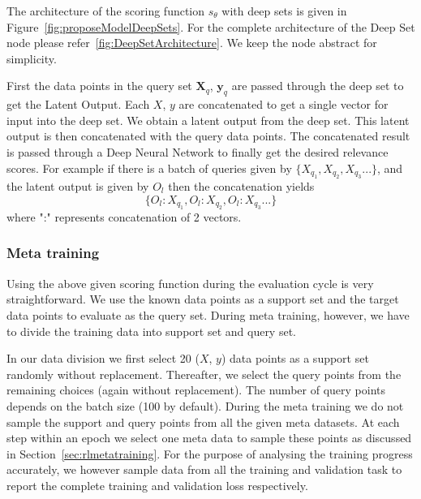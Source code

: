 \documentclass[12pt, twoside, ngerman]{report}
\begin{document}
The  architecture of the scoring function $s_{\theta}$ with deep sets is given in Figure~\ref{fig:proposeModelDeepSets}.
For the complete architecture of the Deep Set node please refer~\ref{fig:DeepSetArchitecture}.
We keep the node abstract for simplicity.\

First the data points in the query set $\textbf{X}_q$, $\textbf{y}_q$ are passed through the deep set to get the Latent Output.
Each $X$, $y$ are concatenated to get a single vector for input into the deep set.
We obtain a latent output from the deep set.
This latent output is then concatenated with the query data points.
The concatenated result is passed through a Deep Neural Network to finally get the desired relevance scores.
For example if there is a batch of queries given by $\{X_{q_1},  X_{q_2},  X_{q_3} ...\}$,  and the latent output is given by $O_l$ then the concatenation yields
$$
\{O_l:X_{q_1},  O_l:X_{q_2},  O_l:X_{q_3} ...\}
$$
where ":" represents concatenation of 2 vectors.

\subsubsection{Meta training}

Using the above given scoring function during the evaluation cycle is very straightforward.
We use the known data points as a support set and the target data points to evaluate as the query set.
During meta training,  however,  we have to divide the training data into support set and query set.

In our data division we first select 20 ($X$, $y$) data points as a support set randomly without replacement.
Thereafter,  we select the query points from the remaining choices (again without replacement). The number of query points depends on the batch size (100 by default).
During the meta training we do not sample the support and query points from all the given meta datasets.
At each step within an epoch we select one meta data to sample these points as discussed in Section~\ref{sec:rlmetatraining}.
For the purpose of analysing the training progress accurately,  we however sample data from all the training and validation task to report the complete training and validation loss respectively.

\end{document}
